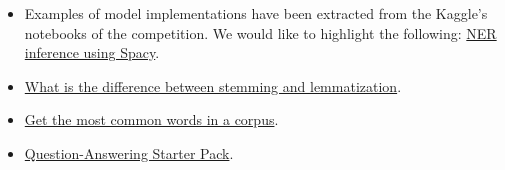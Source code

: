 \documentclass[11pt]{article}
\begin{document}
\begin{itemize}
    \item Examples of model implementations have been extracted from the Kaggle's notebooks of the competition. We would like to highlight the following: \href{https://www.kaggle.com/rohitsingh9990/ner-inference-using-spacy-lb-0-628}{NER inference using Spacy}.
    \item \href{https://blog.bitext.com/what-is-the-difference-between-stemming-and-lemmatization/}{What is the difference between stemming and lemmatization}.
    \item \href{https://medium.com/@cristhianboujon/how-to-list-the-most-common-words-from-text-corpus-using-scikit-learn-dad4d0cab41d}{Get the most common words in a corpus}.
    \item \href{https://www.kaggle.com/jonathanbesomi/question-answering-starter-pack}{Question-Answering Starter Pack}.
\end{itemize}
\end{document}
